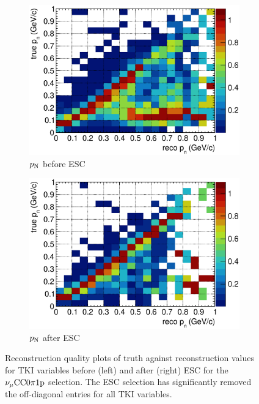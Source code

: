 \begin{figure}
\begin{subfigure}[b]{\dbfigwid\textwidth}
          \end{subfigure}
          \\
          \begin{subfigure}[b]{\dbfigwid\textwidth}
               \centering
               \includegraphics[width=\textwidth]{figures/perf/tki/pn_colnor_resmat_al13.eps}
               \caption{$p_\textrm{N}$ before ESC}
               \label{subfig:esc-pn-bfesc}
          \end{subfigure}
          \begin{subfigure}[b]{\dbfigwid\textwidth}
               \centering
               \includegraphics[width=\textwidth]{figures/perf/tki/pn_colnor_resmat_al14.eps}
               \caption{$p_\textrm{N}$ after ESC}
               \label{subfig:esc-pn-afesc}
          \end{subfigure}
          \caption{Reconstruction quality plots of truth against reconstruction values for TKI variables before (left) and after (right) ESC for the $\nu_{\mu}\textrm{CC}0\pi1\textrm{p}$ selection. The ESC selection has significantly removed the off-diagonal entries for all TKI variables.}
          \label{fig:mc-tki-0pi-esc}
     \end{figure}

